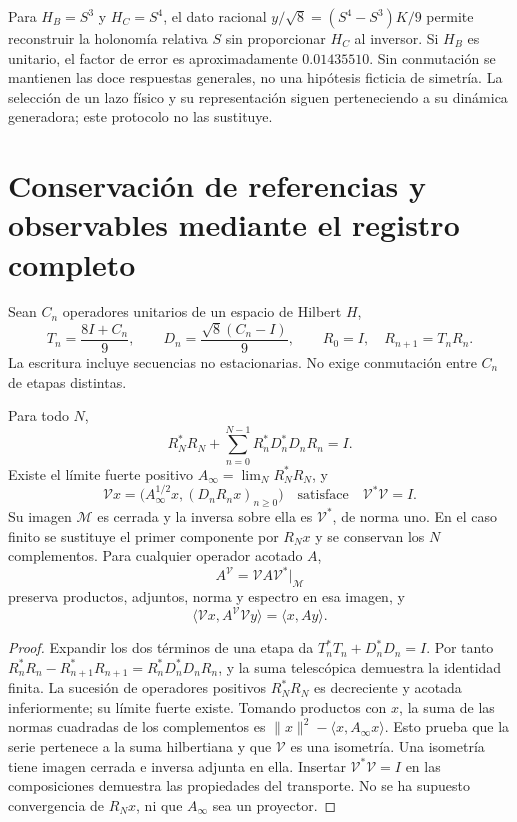Para \(H_B=S^3\) y \(H_C=S^4\), el dato racional
\(y/\sqrt8=(S^4-S^3)K/9\) permite reconstruir la holonomía relativa
\(S\) sin proporcionar \(H_C\) al inversor. Si \(H_B\) es
unitario, el factor de error es aproximadamente \(0.01435510\). Sin
conmutación se mantienen las doce respuestas generales, no una hipótesis
ficticia de simetría. La selección de un lazo físico y su representación
siguen perteneciendo a su dinámica generadora; este protocolo no las
sustituye.

\section{Conservación de referencias y observables mediante el registro completo}
\label{x_reciprocidad:lib01:memoria-completa}

Sean \(C_n\) operadores unitarios de un espacio de Hilbert \(H\),
\[
 T_n=\frac{8I+C_n}{9},\qquad
 D_n=\frac{\sqrt8(C_n-I)}9,\qquad
 R_0=I,\quad R_{n+1}=T_nR_n.
\]
La escritura incluye secuencias no estacionarias. No exige conmutación
entre \(C_n\) de etapas distintas.

\begin{theorem}
\label{x_reciprocidad:lib01:isometria}
Para todo \(N\),
\[
 R_N^*R_N+\sum_{n=0}^{N-1}R_n^*D_n^*D_nR_n=I.
\]
Existe el límite fuerte positivo
\(A_\infty=\lim_N R_N^*R_N\), y
\begin{equation}
 \mathcal Vx=
 \bigl(A_\infty^{1/2}x,(D_nR_nx)_{n\geq0}\bigr)
 \quad\text{satisface}\quad\mathcal V^*\mathcal V=I.
 \label{x_reciprocidad:lib01:V-infinita}
\end{equation}
Su imagen \(\mathcal M\) es cerrada y la inversa sobre ella es
\(\mathcal V^*\), de norma uno. En el caso finito se sustituye el
primer componente por \(R_Nx\) y se conservan los \(N\)
complementos. Para cualquier operador acotado \(A\),
\[
 A^{\mathcal V}=\mathcal VA\mathcal V^*\big|_{\mathcal M}
\]
preserva productos, adjuntos, norma y espectro en esa imagen, y
\[
 \langle\mathcal Vx,A^{\mathcal V}\mathcal Vy\rangle
 =\langle x,Ay\rangle.
\]
\end{theorem}
\begin{proof}
Expandir los dos términos de una etapa da
\(T_n^*T_n+D_n^*D_n=I\). Por tanto
\(R_n^*R_n-R_{n+1}^*R_{n+1}=R_n^*D_n^*D_nR_n\), y la suma
telescópica demuestra la identidad finita. La sucesión de operadores
positivos \(R_N^*R_N\) es decreciente y acotada inferiormente; su
límite fuerte existe. Tomando productos con \(x\), la suma de las
normas cuadradas de los complementos es
\(\|x\|^2-\langle x,A_\infty x\rangle\). Esto prueba que la
serie pertenece a la suma hilbertiana y que \(\mathcal V\) es una
isometría. Una isometría tiene imagen cerrada e inversa adjunta en ella.
Insertar \(\mathcal V^*\mathcal V=I\) en las composiciones demuestra
las propiedades del transporte. No se ha supuesto convergencia de
\(R_Nx\), ni que \(A_\infty\) sea un proyector.
\end{proof}

